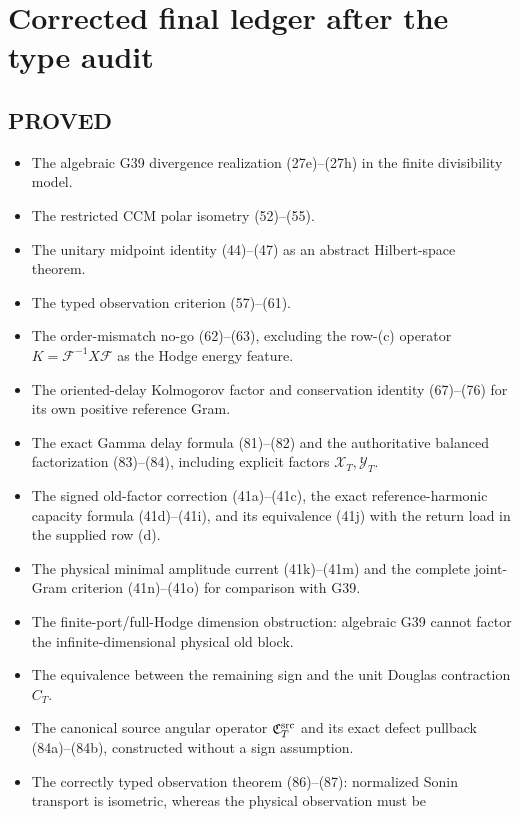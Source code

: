 \documentclass[11pt]{article}
\begin{document}
\section{Corrected final ledger after the type audit}

\subsection*{PROVED}
\begin{itemize}
\item The algebraic G39 divergence realization (27e)--(27h) in the finite
      divisibility model.
\item The restricted CCM polar isometry (52)--(55).
\item The unitary midpoint identity (44)--(47) as an abstract Hilbert-space
      theorem.
\item The typed observation criterion (57)--(61).
\item The order-mismatch no-go (62)--(63), excluding the row-(c) operator
      $K=\mathcal F^{-1}X\mathcal F$ as the Hodge energy feature.
\item The oriented-delay Kolmogorov factor and conservation identity
      (67)--(76) for its own positive reference Gram.
\item The exact Gamma delay formula (81)--(82) and the authoritative balanced
      factorization (83)--(84), including explicit factors
      $\mathcal X_T,\mathcal Y_T$.
\item The signed old-factor correction (41a)--(41c), the exact
      reference-harmonic capacity formula (41d)--(41i), and its equivalence
      (41j) with the return load in the supplied row (d).
\item The physical minimal amplitude current (41k)--(41m) and the complete
      joint-Gram criterion (41n)--(41o) for comparison with G39.
\item The finite-port/full-Hodge dimension obstruction: algebraic G39 cannot
      factor the infinite-dimensional physical old block.
\item The equivalence between the remaining sign and the unit Douglas
      contraction $C_T$.
\item The canonical source angular operator
      $\mathfrak C_T^{\rm src}$ and its exact defect pullback
      (84a)--(84b), constructed without a sign assumption.
\item The correctly typed observation theorem (86)--(87): normalized Sonin
      transport is isometric, whereas the physical observation must be

\end{itemize}
\end{document}
